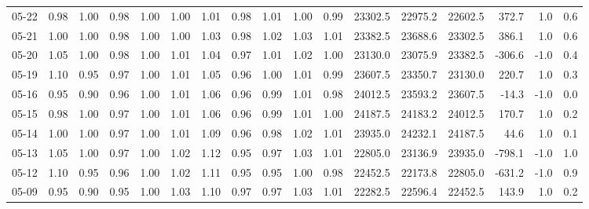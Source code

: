 \begin{threeparttable}
{\begin{tabular}{lrrrrrrrrrrrrrrrr}
  05-22 &   0.98 &   1.00 &         0.98 &     1.00 &           1.00 &        1.01 &        0.98 &        1.01 &          1.00 &          0.99 & 23302.5 & 22975.2 & 22602.5 &      372.7 &                      1.0 &                 0.6 \\
  05-21 &   1.00 &   1.00 &         0.98 &     1.00 &           1.00 &        1.03 &        0.98 &        1.02 &          1.03 &          1.01 & 23382.5 & 23688.6 & 23302.5 &      386.1 &                      1.0 &                 0.6 \\
  05-20 &   1.05 &   1.00 &         0.98 &     1.00 &           1.01 &        1.04 &        0.97 &        1.01 &          1.02 &          1.00 & 23130.0 & 23075.9 & 23382.5 &     -306.6 &                     -1.0 &                 0.4 \\
  05-19 &   1.10 &   0.95 &         0.97 &     1.00 &           1.01 &        1.05 &        0.96 &        1.00 &          1.01 &          0.99 & 23607.5 & 23350.7 & 23130.0 &      220.7 &                      1.0 &                 0.3 \\
  05-16 &   0.95 &   0.90 &         0.96 &     1.00 &           1.01 &        1.06 &        0.96 &        0.99 &          1.01 &          0.98 & 24012.5 & 23593.2 & 23607.5 &      -14.3 &                     -1.0 &                 0.0 \\
  05-15 &   0.98 &   1.00 &         0.97 &     1.00 &           1.01 &        1.06 &        0.96 &        0.99 &          1.01 &          1.00 & 24187.5 & 24183.2 & 24012.5 &      170.7 &                      1.0 &                 0.2 \\
  05-14 &   1.00 &   1.00 &         0.97 &     1.00 &           1.01 &        1.09 &        0.96 &        0.98 &          1.02 &          1.01 & 23935.0 & 24232.1 & 24187.5 &       44.6 &                      1.0 &                 0.1 \\
  05-13 &   1.05 &   1.00 &         0.97 &     1.00 &           1.02 &        1.12 &        0.95 &        0.97 &          1.03 &          1.01 & 22805.0 & 23136.9 & 23935.0 &     -798.1 &                     -1.0 &                 1.0 \\
  05-12 &   1.10 &   0.95 &         0.96 &     1.00 &           1.02 &        1.11 &        0.95 &        0.95 &          1.00 &          0.98 & 22452.5 & 22173.8 & 22805.0 &     -631.2 &                     -1.0 &                 0.9 \\
  05-09 &   0.95 &   0.90 &         0.95 &     1.00 &           1.03 &        1.10 &        0.97 &        0.97 &          1.03 &          1.01 & 22282.5 & 22596.4 & 22452.5 &      143.9 &                      1.0 &                 0.2 \\

\end{tabular}}
\end{threeparttable}
